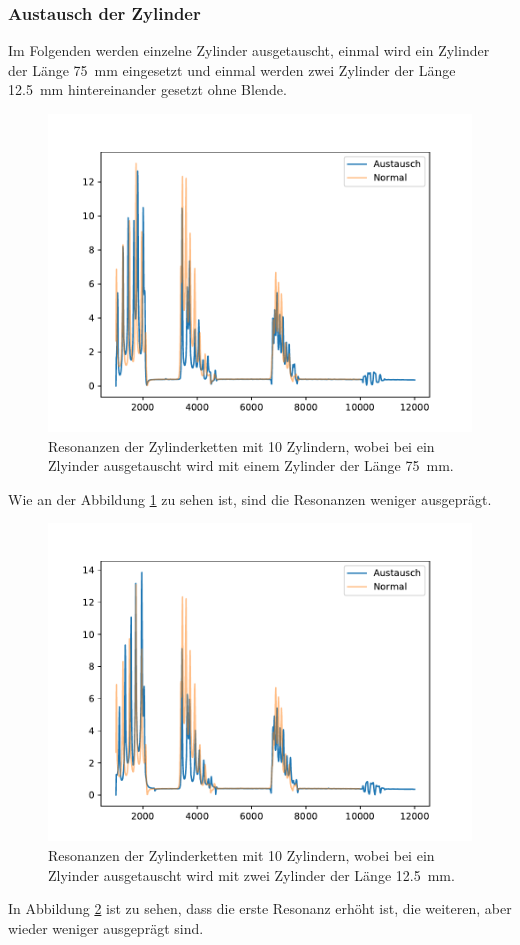 \subsubsection{Austausch der Zylinder}
Im Folgenden werden einzelne Zylinder ausgetauscht, einmal wird ein Zylinder der Länge \SI{75}{\milli\meter} eingesetzt und
einmal werden zwei Zylinder der Länge \SI{12.5}{\milli\meter} hintereinander gesetzt ohne Blende.
\FloatBarrier
\begin{figure}
    \centering
    \includegraphics[width=\textwidth,keepaspectratio]{figure/Austausch_75mm.pdf}
    \caption{Resonanzen der Zylinderketten mit 10 Zylindern, wobei bei ein Zlyinder ausgetauscht wird mit einem Zylinder der Länge \SI{75}{\milli\meter}.}
    \label{fig:Austausch_75}
\end{figure}
\FloatBarrier
Wie an der Abbildung \ref{fig:Austausch_75} zu sehen ist, sind die Resonanzen weniger ausgeprägt.
\FloatBarrier
\begin{figure}
    \centering
    \includegraphics[width=\textwidth,keepaspectratio]{figure/Austausch_25mm.pdf}
    \caption{Resonanzen der Zylinderketten mit 10 Zylindern, wobei bei ein Zlyinder ausgetauscht wird mit zwei Zylinder der Länge \SI{12.5}{\milli\meter}.}
    \label{fig:Austausch_25}
\end{figure}
\FloatBarrier
In Abbildung \ref{fig:Austausch_25} ist zu sehen, dass die erste Resonanz erhöht ist, die weiteren, aber wieder weniger ausgeprägt sind.


